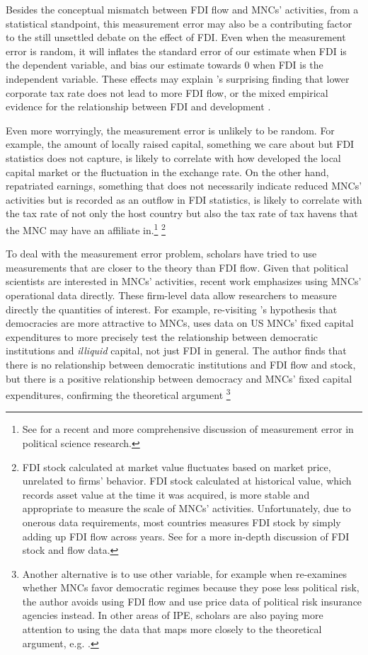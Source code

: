 Besides the conceptual mismatch between FDI flow and MNCs' activities, from a
statistical standpoint, this measurement error may also be a contributing factor
to the still unsettled debate on the effect of FDI. Even when the measurement
error is random, it will inflates the standard error of our estimate when FDI is
the dependent variable, and bias our estimate towards 0 when FDI is the
independent variable. These effects may explain \citet{Jensen2012}'s surprising
finding that lower corporate tax rate does not lead to more FDI flow, or the
mixed empirical evidence for the relationship between FDI and development
\citep[108]{Mold2004}.

Even more worryingly, the measurement error is unlikely to be random. For
example, the amount of locally raised capital, something we care about but FDI
statistics does not capture, is likely to correlate with how developed the local
capital market or the fluctuation in the exchange rate. On the other hand,
repatriated earnings, something that does not necessarily indicate reduced MNCs'
activities but is recorded as an outflow in FDI statistics, is likely to
correlate with the tax rate of not only the host country but also the tax rate
of tax havens that the MNC may have an affiliate in.\footnote{See
\citet{Gallop2017} for a recent and more comprehensive discussion of measurement
error in political science research.} \footnote{FDI stock calculated at market
value fluctuates based on market price, unrelated to firms' behavior. FDI stock
calculated at historical value, which records asset value at the time it was
acquired, is more stable and appropriate to measure the scale of MNCs'
activities. Unfortunately, due to onerous data requirements, most countries
measures FDI stock by simply adding up FDI flow across years. See
\citet[809]{Kerner2014} for a more in-depth discussion of FDI stock and flow
data.}

To deal with the measurement error problem, scholars have tried to use
measurements that are closer to the theory than FDI flow. Given that political
scientists are interested in MNCs' activities, recent work emphasizes using
MNCs' operational data directly. These firm-level data allow researchers to
measure directly the quantities of interest. For example, re-visiting
\citet{Li2009a}'s hypothesis that democracies are more attractive to MNCs,
\citet{Kerner2014} uses data on US MNCs' fixed capital expenditures to more
precisely test the relationship between democratic institutions and
\textit{illiquid} capital, not just FDI in general. The author finds that there
is no relationship between democratic institutions and FDI flow and stock, but
there is a positive relationship between democracy and MNCs' fixed capital
expenditures, confirming the theoretical argument \footnote{Another alternative
is to use other variable, for example when \citet{Jensen2008} re-examines
whether MNCs favor democratic regimes because they pose less political risk, the
author avoids using FDI flow and use price data of political risk insurance
agencies instead. In other areas of IPE, scholars are also paying more attention
to using the data that maps more closely to the theoretical argument, e.g.
\citep{Karcher2013}.}

